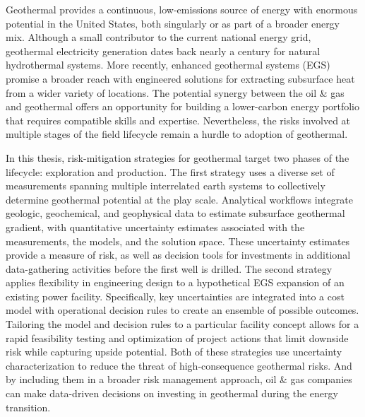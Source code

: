 %
Geothermal provides a continuous, low-emissions source of energy with enormous potential in the United States, both singularly or as part of a broader energy mix. Although a small contributor to the current national energy grid, geothermal electricity generation dates back nearly a century for natural hydrothermal systems. More recently, enhanced geothermal systems (EGS) promise a broader reach with engineered solutions for extracting subsurface heat from a wider variety of locations. The potential synergy between the oil \& gas and geothermal offers an opportunity for building a lower-carbon energy portfolio that requires compatible skills and expertise. Nevertheless, the risks involved at multiple stages of the field lifecycle remain a hurdle to adoption of geothermal.

In this thesis, risk-mitigation strategies for geothermal target two phases of the lifecycle: exploration and production. The first strategy uses a diverse set of measurements spanning multiple interrelated earth systems to collectively determine geothermal potential at the play scale. Analytical workflows integrate geologic, geochemical, and geophysical data to estimate subsurface geothermal gradient, with quantitative uncertainty estimates associated with the measurements, the models, and the solution space. These uncertainty estimates provide a measure of risk, as well as decision tools for investments in additional data-gathering activities before the first well is drilled. The second strategy applies flexibility in engineering design to a hypothetical EGS expansion of an existing power facility. Specifically, key uncertainties are integrated into a cost model with operational decision rules to create an ensemble of possible outcomes. Tailoring the model and decision rules to a particular facility concept allows for a rapid feasibility testing and optimization of project actions that limit downside risk while capturing upside potential. Both of these strategies use uncertainty characterization to reduce the threat of high-consequence geothermal risks. And by including them in a broader risk management approach, oil \& gas companies can make data-driven decisions on investing in geothermal during the energy transition.